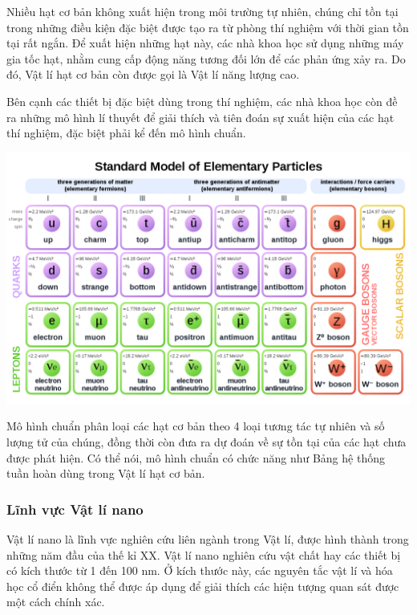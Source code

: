 Nhiều hạt cơ bản không xuất hiện trong môi trường tự nhiên, chúng chỉ tồn tại trong những điều kiện đặc biệt được tạo ra từ phòng thí nghiệm với thời gian tồn tại rất ngắn. Để xuất hiện những hạt này, các nhà khoa học sử dụng những máy gia tốc hạt, nhằm cung cấp động năng tương đối lớn để các phản ứng xảy ra. Do đó, Vật lí hạt cơ bản còn được gọi là Vật lí năng lượng cao.

Bên cạnh các thiết bị đặc biệt dùng trong thí nghiệm, các nhà khoa học còn đề ra những mô hình lí thuyết để giải thích và tiên đoán sự xuất hiện của các hạt thí nghiệm, đặc biệt phải kể đến mô hình chuẩn.

\begin{center}
	\includegraphics[scale=0.3]{../figs/G10-002-4.png}
\end{center}

Mô hình chuẩn phân loại các hạt cơ bản theo 4 loại tương tác tự nhiên và số lượng tử của chúng, đồng thời còn đưa ra dự đoán về sự tồn tại của các hạt chưa được phát hiện. Có thể nói, mô hình chuẩn có chức năng như Bảng hệ thống tuần hoàn dùng trong Vật lí hạt cơ bản.
\subsubsection{Lĩnh vực Vật lí nano}
Vật lí nano là lĩnh vực nghiên cứu liên ngành trong Vật lí, được hình thành trong những năm đầu của thế kỉ XX. Vật lí nano nghiên cứu vật chất hay các thiết bị có kích thước từ 1 đến 100 nm. Ở kích thước này, các nguyên tắc vật lí và hóa học cổ điển không thể được áp dụng để giải thích các hiện tượng quan sát được một cách chính xác.

